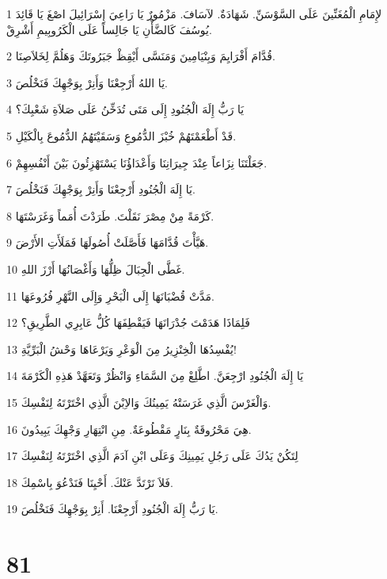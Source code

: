 \par 1 لإِمَامِ الْمُغَنِّينَ عَلَى السَّوْسَنِّ. شَهَادَةٌ. لآسَافَ. مَزْمُورٌ يَا رَاعِيَ إِسْرَائِيلَ اصْغَ يَا قَائِدَ يُوسُفَ كَالضَّأْنِ يَا جَالِساً عَلَى الْكَرُوبِيمِ أَشْرِقْ.
\par 2 قُدَّامَ أَفْرَايِمَ وَبِنْيَامِينَ وَمَنَسَّى أَيْقِظْ جَبَرُوتَكَ وَهَلُمَّ لِخَلاَصِنَا.
\par 3 يَا اللهُ أَرْجِعْنَا وَأَنِرْ بِوَجْهِكَ فَنَخْلُصَ.
\par 4 يَا رَبُّ إِلَهَ الْجُنُودِ إِلَى مَتَى تُدَخِّنُ عَلَى صَلاَةِ شَعْبِكَ؟
\par 5 قَدْ أَطْعَمْتَهُمْ خُبْزَ الدُّمُوعِ وَسَقَيْتَهُمُ الدُّمُوعَ بِالْكَيْلِ.
\par 6 جَعَلْتَنَا نِزَاعاً عِنْدَ جِيرَانِنَا وَأَعْدَاؤُنَا يَسْتَهْزِئُونَ بَيْنَ أَنْفُسِهِمْ.
\par 7 يَا إِلَهَ الْجُنُودِ أَرْجِعْنَا وَأَنِرْ بِوَجْهِكَ فَنَخْلُصَ.
\par 8 كَرْمَةً مِنْ مِصْرَ نَقَلْتَ. طَرَدْتَ أُمَماً وَغَرَسْتَهَا.
\par 9 هَيَّأْتَ قُدَّامَهَا فَأَصَّلَتْ أُصُولَهَا فَمَلَأَتِ الأَرْضَ.
\par 10 غَطَّى الْجِبَالَ ظِلُّهَا وَأَغْصَانُهَا أَرْزَ اللهِ.
\par 11 مَدَّتْ قُضْبَانَهَا إِلَى الْبَحْرِ وَإِلَى النَّهْرِ فُرُوعَهَا.
\par 12 فَلِمَاذَا هَدَمْتَ جُدْرَانَهَا فَيَقْطِفَهَا كُلُّ عَابِرِي الطَّرِيقِ؟
\par 13 يُفْسِدُهَا الْخِنْزِيرُ مِنَ الْوَعْرِ وَيَرْعَاهَا وَحْشُ الْبَرِّيَّةِ!
\par 14 يَا إِلَهَ الْجُنُودِ ارْجِعَنَّ. اطَّلِعْ مِنَ السَّمَاءِ وَانْظُرْ وَتَعَهَّدْ هَذِهِ الْكَرْمَةَ
\par 15 وَالْغَرْسَ الَّذِي غَرَسَتْهُ يَمِينُكَ وَالاِبْنَ الَّذِي اخْتَرْتَهُ لِنَفْسِكَ.
\par 16 هِيَ مَحْرُوقَةٌ بِنَارٍ مَقْطُوعَةٌ. مِنِ انْتِهَارِ وَجْهِكَ يَبِيدُونَ.
\par 17 لِتَكُنْ يَدُكَ عَلَى رَجُلِ يَمِينِكَ وَعَلَى ابْنِ آدَمَ الَّذِي اخْتَرْتَهُ لِنَفْسِكَ
\par 18 فَلاَ نَرْتَدَّ عَنْكَ. أَحْيِنَا فَنَدْعُوَ بِاسْمِكَ.
\par 19 يَا رَبُّ إِلَهَ الْجُنُودِ أَرْجِعْنَا. أَنِرْ بِوَجْهِكَ فَنَخْلُصَ.

\chapter{81}

